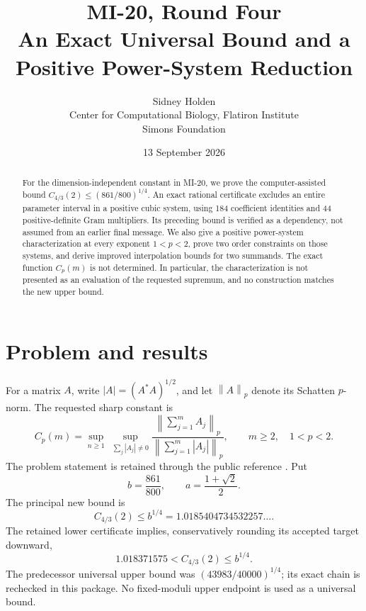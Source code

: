 \documentclass[11pt]{article}
\title{MI-20, Round Four\\An Exact Universal Bound and a Positive Power-System Reduction}
\author{Sidney Holden\\{\small Center for Computational Biology, Flatiron Institute}\\{\small Simons Foundation}}
\date{13 September 2026}
\newcommand{\norm}[1]{\left\lVert#1\right\rVert}
\theoremstyle{remark}\newtheorem{remark}[theorem]{Remark}
\begin{document}
\maketitle
\begin{abstract}
For the dimension-independent constant in MI-20, we prove the computer-assisted bound
\(C_{4/3}(2)\le(861/800)^{1/4}\).
An exact rational certificate excludes an entire parameter interval in a positive cubic system, using 184 coefficient identities and 44 positive-definite Gram multipliers. Its preceding bound is verified as a dependency, not assumed from an earlier final message. We also give a positive power-system characterization at every exponent \(1<p<2\), prove two order constraints on those systems, and derive improved interpolation bounds for two summands. The exact function \(C_p(m)\) is not determined. In particular, the characterization is not presented as an evaluation of the requested supremum, and no construction matches the new upper bound.
\end{abstract}
\begin{center}\end{center}
\tableofcontents

\section{Problem and results}
For a matrix \(A\), write \(|A|=(A^*A)^{1/2}\), and let \(\norm A_p\) denote its Schatten \(p\)-norm. The requested sharp constant is
\begin{equation}\label{def:C}
 C_p(m)=\sup_{n\ge1}\ \sup_{\sum_j|A_j|\ne0}
 \frac{\norm{\sum_{j=1}^m A_j}_p}{\norm{\sum_{j=1}^m|A_j|}_p},
 \qquad m\ge2,\quad1<p<2.
\end{equation}
The problem statement is retained through the public reference \cite{problem}. Put
\[
 b=\frac{861}{800},\qquad a=\frac{1+\sqrt2}{2}.
\]
The principal new bound is
\begin{equation}\label{eq:mainbound}
 \boxed{C_{4/3}(2)\le b^{1/4}=1.0185404734532257\ldots.}
\end{equation}
The retained lower certificate implies, conservatively rounding its accepted target downward,
\begin{equation}\label{eq:enclosure}
 1.018371575<C_{4/3}(2)\le b^{1/4}.
\end{equation}
The predecessor universal upper bound was \((43983/40000)^{1/4}\); its exact chain is rechecked in this package. No fixed-moduli upper endpoint is used as a universal bound.
\end{document}

